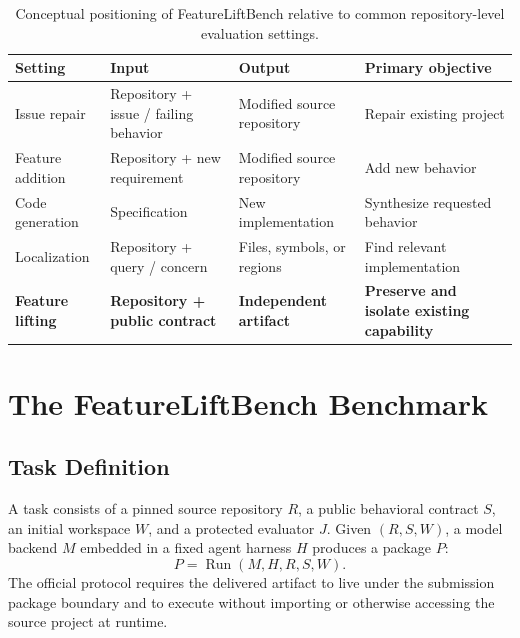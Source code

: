 \documentclass[acmsmall,screen,review,anonymous]{acmart}
\begin{document}
\begin{table}[t]
  \caption{Conceptual positioning of FeatureLiftBench relative to common
  repository-level evaluation settings.}
  \label{tab:positioning}
  \centering
  \begin{tabularx}{\textwidth}{@{}p{}p{}p{}X@{}}
    \toprule
    \textbf{Setting} & \textbf{Input} & \textbf{Output} & \textbf{Primary objective} \\
    \midrule
    Issue repair & Repository + issue / failing behavior & Modified source repository & Repair existing project \\
    Feature addition & Repository + new requirement & Modified source repository & Add new behavior \\
    Code generation & Specification & New implementation & Synthesize requested behavior \\
    Localization & Repository + query / concern & Files, symbols, or regions & Find relevant implementation \\
    \textbf{Feature lifting} & \textbf{Repository + public contract} & \textbf{Independent artifact} & \textbf{Preserve and isolate existing capability} \\
    \bottomrule
  \end{tabularx}
\end{table}

\section{The FeatureLiftBench Benchmark}
\label{sec:benchmark}

\subsection{Task Definition}
\label{sec:task-definition}

A task consists of a pinned source repository $R$, a public behavioral contract
$S$, an initial workspace $W$, and a protected evaluator $J$. Given
$(R,S,W)$, a model backend $M$ embedded in a fixed agent harness $H$ produces a
package $P$:
\begin{equation}
  P = \operatorname{Run}(M,H,R,S,W).
  \label{eq:run}
\end{equation}
The official protocol requires the delivered artifact to live under the
submission package boundary and to execute without importing or otherwise
accessing the source project at runtime.
\end{document}
